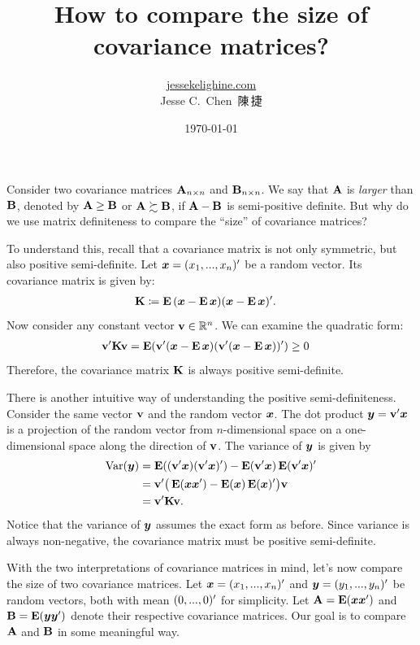 \documentclass[a4paper]{article}
\title{How to compare the size of covariance matrices?}
\author{\href{https://jessekelighine.com}{jessekelighine.com}\\Jesse C.\ Chen\ 陳\,捷}
\date{\today}
\begin{document}
\maketitle

\begin{multicols}{2}

\noindent
Consider two covariance matrices $\AA_{n\times n}$ and $\BB_{n\times n}$.
We say that $\AA$ is \emph{larger} than $\BB$,
denoted by $\AA\geq \BB$ or $\AA\succsim \BB$,
if $\AA-\BB$ is semi-positive definite.
But why do we use matrix definiteness to compare the ``size'' of covariance matrices?

To understand this,
recall that a covariance matrix is not only symmetric,
but also positive semi-definite.
Let $\xx=(x_1,...,x_n)\T$ be a random vector.
Its covariance matrix is given by:
\begin{align*}
	\KK &\coloneqq \E{(\xx-\E{\xx})(\xx-\E{\xx})\T}.
\end{align*}
Now consider any constant vector $\vv\in\reals^n$.
We can examine the quadratic form:
\begin{align*}
	\vv\T \KK \vv &= \E(\vv\T(\xx-\E{\xx})(\vv\T(\xx-\E{\xx}))\T) \geq 0
\end{align*}
Therefore, the covariance matrix $\KK$ is always positive semi-definite.

There is another intuitive way of understanding the positive semi-definiteness.
Consider the same vector $\vv$ and the random vector $\xx$.
The dot product $\yy=\vv\T \xx$ is a projection of the random vector from $n$-dimensional
space on a one-dimensional space along the direction of $\vv$.
The variance of $\yy$ is given by
\begin{align*}
	\var(\yy)
	&= \E((\vv\T \xx)(\vv\T \xx)\T ) - \E(\vv\T \xx)\E(\vv\T \xx)\T  \\
	&= \vv\T \big(\E(\xx\xx\T ) - \E(\xx)\E(\xx)\T \big)\vv \\
	&= \vv\T \KK\vv.
\end{align*}
Notice that the variance of $\yy$ assumes the exact form as before.
Since variance is always non-negative, the covariance matrix must be positive semi-definite.

With the two interpretations of covariance matrices in mind,
let's now compare the size of two covariance matrices.
Let $\xx=(x_1,...,x_n)\T$ and $\yy=(y_1,...,y_n)\T$ be random vectors, both with mean $(0,...,0)\T$ for simplicity.
Let $\AA=\E(\xx\xx\T)$ and $\BB=\E(\yy\yy\T)$ denote their respective covariance matrices.
Our goal is to compare $\AA$ and $\BB$ in some meaningful way.


\end{multicols}
\end{document}

